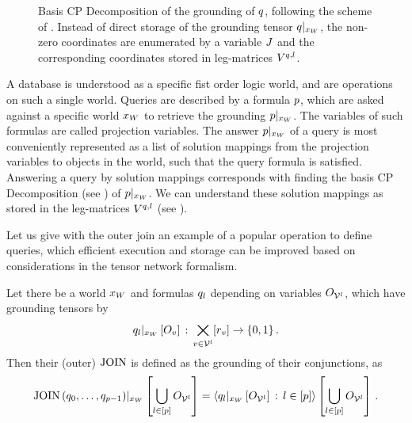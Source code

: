 \begin{figure}[h]
    \begin{center}
        
    \end{center}
    \caption{Basis CP Decomposition of the grounding of $q$, following the scheme of .
    Instead of direct storage of the grounding tensor ${q}|_{x_{W}}$, the non-zero coordinates are enumerated by a variable $J$ and the corresponding coordinates stored in leg-matrices $V^{q,l}$.}
    \label{fig:groundingCP}
\end{figure}


A database is understood as a specific fist order logic world, and are operations on such a single world.
Queries are described by a formula $p$, which are asked against a specific world $x_{W}$ to retrieve the grounding ${p}|_{x_{W}}$.
The variables of such formulas are called projection variables.
The answer ${p}|_{x_{W}}$ of a query is most conveniently represented as a list of solution mappings from the projection variables to objects in the world, such that the query formula is satisfied.
Answering a query by solution mappings corresponds with finding the basis CP Decomposition (see ) of ${p}|_{x_{W}}$.
We can understand these solution mappings as stored in the leg-matrices $V^{q,l}$ (see ).

Let us give with the outer join an example of a popular operation to define queries, which efficient execution and storage can be improved based on considerations in the tensor network formalism.

\begin{definition}
    Let there be a world $x_{W}$ and formulas $q_{l}$ depending on variables $O_{\mathcal{V}^{l}}$, which have grounding tensors by
    \begin{align*}
        {q_{l}}|_{x_{W}} \left[O_{v}\right] \, : \,  \bigtimes_{v\in\mathcal{V}^{l}}[r_{v}] \rightarrow \{0,1\} \, .
    \end{align*}
    Then their (outer) $\mathrm{JOIN}$ is defined as the grounding of their conjunctions, as
    \begin{align*}
        {\mathrm{JOIN}\left(q_{0},\ldots,q_{p-1}\right)}|_{x_{W}} \left[\bigcup_{l\in[p]}O_{\mathcal{V}^{l}}\right]
        = \left\langle {q_{l}}|_{x_{W}} \left[O_{\mathcal{V}^{l}}\right]\,:\,l\in[p]\right\rangle \left[ \bigcup_{l\in[p]}O_{\mathcal{V}^{l}} \right] \, .
    \end{align*}
\end{definition}

